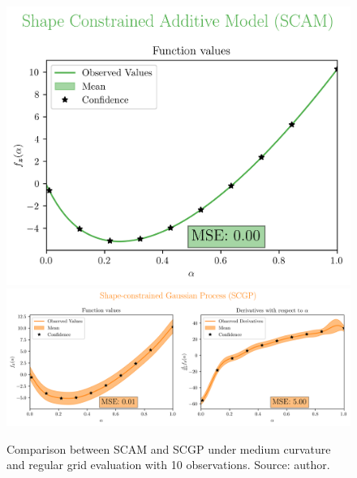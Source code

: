 \begin{figure}[H]
    \centering
    \includegraphics[width=.33\textwidth]{../experiments/uniform_new_MC/SCAM_10_nobs.png}
    \includegraphics[width=.66\textwidth]{../experiments/uniform_new_MC/SCGP_10_nobs.png}
    \caption{ {\small Comparison between SCAM and SCGP under medium curvature and regular grid evaluation with 10 observations. Source: author.}}
    \label{fig:SCAM10nobs}
\end{figure}
